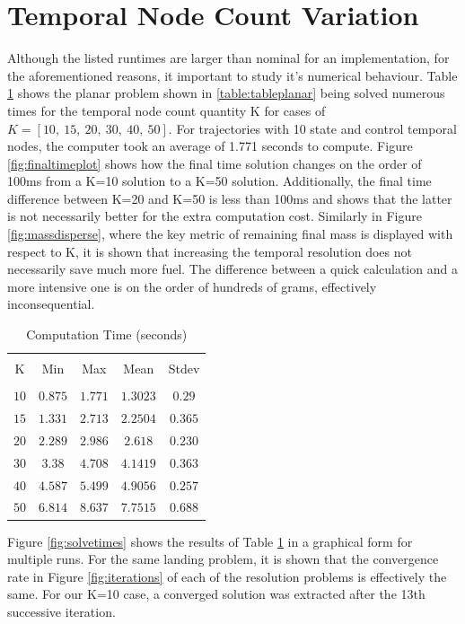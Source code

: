 \section{Temporal Node Count Variation}
Although the listed runtimes are larger than nominal for an implementation, for the aforementioned reasons, it important to study it's numerical behaviour. Table \ref{table:timingtable} shows the planar problem shown in \ref{table:tableplanar} being solved numerous times for the temporal node count quantity K for cases of $K = [10, \ 15, \ 20, \ 30, \ 40, \ 50]$. For trajectories with 10 state and control temporal nodes, the computer took an average of 1.771 seconds to compute. Figure \ref{fig:finaltimeplot} shows how the final time solution changes on the order of 100ms from a K=10 solution to a K=50 solution. Additionally, the final time difference between K=20 and K=50 is less than 100ms and shows that the latter is not necessarily better for the extra computation cost. Similarly in Figure \ref{fig:massdisperse}, where the key metric of remaining final mass is displayed with respect to K, it is shown that increasing the temporal resolution does not necessarily save much more fuel. The difference between a quick calculation and a more intensive one is on the order of hundreds of grams, effectively inconsequential.


\begin{table}[ht]
\caption{Computation Time (seconds)}
\centering 
\begin{tabular}{c c c c c} 
\hline\hline \\[0.5ex] 
K & Min & Max & Mean & Stdev \\ 
\hline \\
$10$    &$0.875 $   &$1.771 $  &$1.3023  $  &$0.29$   \\ 
$15$    &$1.331 $   &$2.713 $  &$2.2504  $  &$0.365$  \\ 
$20$    &$2.289$    &$2.986$   &$2.618  $   &$0.230$  \\ 
$30$    &$ 3.38 $   &$4.708 $  &$4.1419  $  &$0.363$  \\ 
$40$    &$4.587 $   &$5.499 $  &$4.9056  $  &$0.257$  \\ 
$50$    &$6.814 $   &$8.637 $  &$7.7515  $  &$0.688$  \\[1ex] 
\hline
\end{tabular}
\label{table:timingtable}
\end{table}

Figure \ref{fig:solvetimes} shows the results of Table \ref{table:timingtable} in a graphical form for multiple runs. For the same landing problem, it is shown that the convergence rate in Figure \ref{fig:iterations} of each of the resolution problems is effectively the same. For our K=10 case, a converged solution was extracted after the 13th successive iteration.


